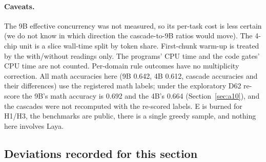 \documentclass[11pt,a4paper]{article}
\begin{document}
\paragraph{Caveats.} The 9B effective concurrency was not measured, so its per-task cost is less certain (we do not
know in which direction the cascade-to-9B ratios would move). The 4-chip unit is a slice
wall-time split by token share. First-chunk warm-up is treated by the with/without readings only. The programs' CPU time and
the code gates' CPU time are not counted. Per-domain rule outcomes have no multiplicity correction. All math accuracies here (9B 0.642, 4B 0.612, cascade accuracies and their differences) use the registered math labels; under the exploratory D62 re-score the 9B's math accuracy is 0.692 and the 4B's 0.664 (Section~\ref{sec:a10}), and the cascades were not recomputed with the re-scored labels. E is burned for H1/H3, the
benchmarks are public, there is a single greedy sample, and nothing here involves Laya.

{}

\subsection{Deviations recorded for this section}
\end{document}
